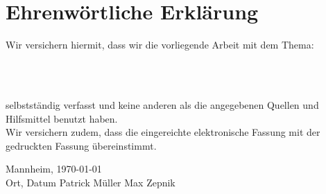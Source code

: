 
\chapter*{Ehrenwörtliche Erklärung}


Wir versichern hiermit, dass wir die vorliegende Arbeit  mit dem Thema:
\begin{center}
	\textsf{\textbf{\Large{}\DerTitelDerArbeit}} \\[0.3cm]
	\textsf{\textbf{\large{}\DerUnterTitelDerArbeit}} \\[1.5cm]
\end{center}
selbstständig verfasst und keine anderen als die angegebenen Quellen und Hilfsmittel benutzt haben.
\\Wir versichern zudem,
dass die eingereichte elektronische Fassung mit der gedruckten Fassung übereinstimmt.

\vspace{3cm}
Mannheim, \today
\\Ort, Datum \hfill Patrick Müller \hfill Max Zepnik
